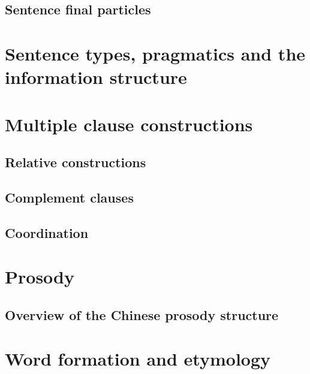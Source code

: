 \documentclass[UTF8, a4paper, oneside, scheme=plain]{ctexbook}
\numberwithin{equation}{chapter}
\numberwithin{equation}{chapter}
\begin{document}
\chapter{Sentence final particles}




\part{Sentence types, pragmatics and the information structure}%

\part{Multiple clause constructions}

\chapter{Relative constructions}\label{chap:relative}

\chapter{Complement clauses}\label{chap:comp-clause}

\chapter{Coordination}

\part{Prosody}

\chapter{Overview of the Chinese prosody structure}\label{chap:prosody-overview}

\part{Word formation and etymology}





\printindex
\end{document}
